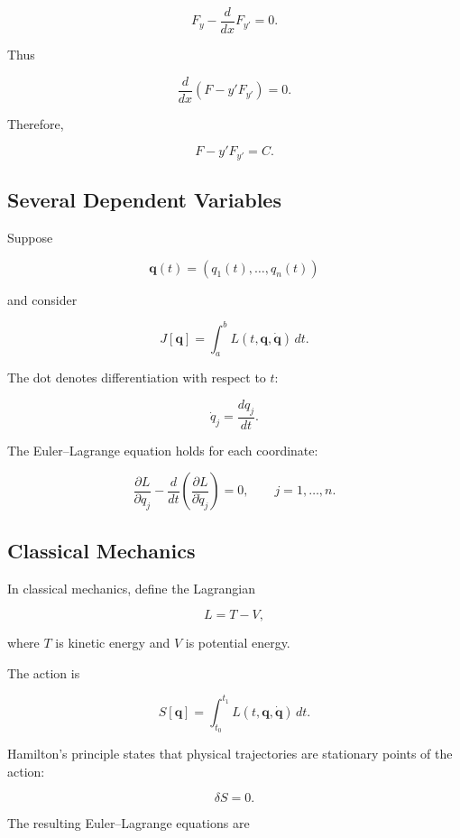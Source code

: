 \[
F_y-\frac{d}{dx}F_{y'}=0.
\]

Thus

\[
\boxed{
\frac{d}{dx}
\left(
F-y'F_{y'}
\right)
=
0.
}
\]

Therefore,

\[
\boxed{
F-y'F_{y'}=C.
}
\]

\subsection{Several Dependent Variables}
\label{subsec:several-dependent-variables}

Suppose

\[
\mathbf{q}(t)
=
(q_1(t),\ldots,q_n(t))
\]

and consider

\[
\boxed{
J[\mathbf{q}]
=
\int_a^b
L(t,\mathbf{q},\dot{\mathbf{q}})\,dt.
}
\]

The dot denotes differentiation with respect to \(t\):

\[
\boxed{
\dot q_j
=
\frac{dq_j}{dt}.
}
\]

The Euler--Lagrange equation holds for each coordinate:

\[
\boxed{
\frac{\partial L}{\partial q_j}
-
\frac{d}{dt}
\left(
\frac{\partial L}{\partial\dot q_j}
\right)
=
0,
\qquad
j=1,\ldots,n.
}
\]

\subsection{Classical Mechanics}
\label{subsec:variational-classical-mechanics}

In classical mechanics, define the Lagrangian

\[
\boxed{
L=T-V,
}
\]

where \(T\) is kinetic energy and \(V\) is potential energy.

The action is

\[
\boxed{
S[\mathbf{q}]
=
\int_{t_0}^{t_1}
L(t,\mathbf{q},\dot{\mathbf{q}})\,dt.
}
\]

Hamilton's principle states that physical trajectories are stationary
points of the action:

\[
\boxed{
\delta S=0.
}
\]

The resulting Euler--Lagrange equations are

